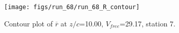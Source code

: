 \begin{figure}[H]
\centering
\texttt{[image: figs/run\_68/run\_68\_R\_contour]}
\caption{Contour plot of $\overline{r}$ at $z/c$=10.00, $V_{free}$=29.17, station 7.}
\label{fig:run_68_R_contour}
\end{figure}


